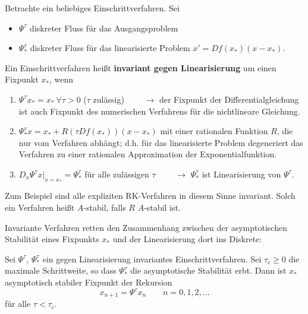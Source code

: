 \documentclass[german]{scrreprt}
\newcommand{\begriff}[1]{\textbf{#1}}
\theoremstyle{plain}
\theoremstyle{nonumberplain}
\theoremstyle{nonumberplain}
\theoremstyle{nonumberplain}
\begin{document}
Betrachte ein beliebiges Einschrittverfahren. Sei
\begin{itemize}
	\item $\Psi^\tau$ diskreter Fluss für das Ausgangsproblem
	\item $\Psi_*^\tau$ diskreter Fluss für das linearisierte Problem $x'=Df(x_*)(x-x_*)$.
\end{itemize}

\begin{definition}
	Ein Einschrittverfahren heißt \begriff{invariant gegen Linearisierung} um einen Fixpunkt $x_*$, wenn
	\begin{enumerate}
		\item $\Psi^\tau x_*=x_*\ \forall\tau>0$ ($\tau$ zulässig)
		$\qquad \rightarrow$ der Fixpunkt der Differentialgleichung ist auch
		Fixpunkt des numerischen Verfahrens für die nichtlineare Gleichung.
		
		\item $\Psi_*^\tau x = x_* + R(\tau Df(x_*))(x-x_*)$ mit einer rationalen Funktion $R$, die nur vom Verfahren abhängt; d.h. für das linearisierte Problem degeneriert das Verfahren zu einer rationalen Approximation der Exponentialfunktion.
		
		\item $D_x\Psi^\tau x\vert_{x=x_*}=\Psi^\tau_*$ für alle zulässigen $\tau$ $\qquad \rightarrow$ $\Psi^\tau_*$ ist Linearisierung von $\Psi^\tau$.
	\end{enumerate}
\end{definition}

Zum Beispiel sind alle expliziten RK-Verfahren in diesem Sinne invariant. Solch ein Verfahren heißt $A$-stabil, falls $R$ $A$-stabil ist.

Invariante Verfahren retten den Zusammenhang zwischen der asymptotischen Stabilität eines Fixpunkts $x_*$ und der Linearisierung dort ins Diskrete:

\begin{satz}
	Sei $\Psi^\tau$, $\Psi^\tau_*$ ein gegen Linearisierung invariantes Einschrittverfahren. Sei $\tau_c\geq 0$ die maximale Schrittweite, so dass $\Psi^\tau_*$ die asymptotische Stabilität erbt. Dann ist $x_*$ asymptotisch stabiler Fixpunkt der Rekursion
	\begin{equation*}
	x_{n+1} = \Psi^\tau x_n\qquad n=0,1,2,\hdots
	\end{equation*}
	für alle $\tau<\tau_c$.
\end{satz}
\end{document}
